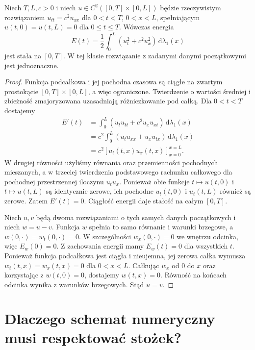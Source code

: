 \begin{stwierdzenie}
\label{prop:pde5-stringenergy}
Niech $T,L,c>0$ i niech
$u\in C^2([0,T]\times[0,L])$ będzie rzeczywistym
rozwiązaniem $u_{tt}=c^2u_{xx}$ dla $0<t<T$,
$0<x<L$, spełniającym $u(t,0)=u(t,L)=0$
dla $0\leq t\leq T$.
Wówczas energia
\[
 E(t)=\frac12\int_0^L(u_t^2+c^2u_x^2)\,
 \mathrm d\lambda_1(x)
\]
jest stała na $[0,T]$. W tej klasie rozwiązanie
z zadanymi danymi początkowymi jest jednoznaczne.
\end{stwierdzenie}
\begin{proof}
Funkcja podcałkowa i jej pochodna czasowa
są ciągłe na zwartym prostokącie
$[0,T]\times[0,L]$, a więc ograniczone.
Twierdzenie o wartości średniej i zbieżność
zmajoryzowana uzasadniają różniczkowanie pod całką.
Dla $0<t<T$ dostajemy
\[
 \begin{aligned}
 E'(t)
 &=\int_0^L(u_tu_{tt}+c^2u_xu_{xt})\,
                       \mathrm d\lambda_1(x)\\
 &=c^2\int_0^L(u_tu_{xx}+u_xu_{tx})\,
                       \mathrm d\lambda_1(x)\\
 &=c^2[u_t(t,x)u_x(t,x)]_{x=0}^{x=L}.
 \end{aligned}
\]
W drugiej równości użyliśmy równania oraz
przemienności pochodnych mieszanych, a w trzeciej
twierdzenia podstawowego rachunku całkowego
dla pochodnej przestrzennej iloczynu $u_tu_x$.
Ponieważ obie funkcje $t\mapsto u(t,0)$
i $t\mapsto u(t,L)$ są identycznie zerowe,
ich pochodne $u_t(t,0)$ i $u_t(t,L)$
również są zerowe. Zatem $E'(t)=0$.
Ciągłość energii daje stałość na całym $[0,T]$.

Niech $u,v$ będą dwoma rozwiązaniami o tych
samych danych początkowych i niech $w=u-v$.
Funkcja $w$ spełnia to samo równanie i warunki
brzegowe, a $w(0,\cdot)=w_t(0,\cdot)=0$.
W szczególności $w_x(0,\cdot)=0$ we wnętrzu
odcinka, więc $E_w(0)=0$. Z zachowania energii
mamy $E_w(t)=0$ dla wszystkich $t$.
Ponieważ funkcja podcałkowa jest ciągła
i nieujemna, jej zerowa całka wymusza
$w_t(t,x)=w_x(t,x)=0$ dla $0<x<L$.
Całkując $w_x$ od $0$ do $x$ oraz korzystając
z $w(t,0)=0$, dostajemy $w(t,x)=0$.
Równość na końcach odcinka wynika z warunków
brzegowych. Stąd $u=v$.
\end{proof}

\section{Dlaczego schemat numeryczny musi respektować stożek?}
\label{sec:pde5-numerics}

